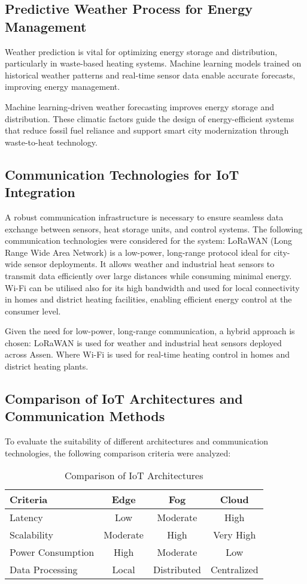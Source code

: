 \documentclass[conference]{IEEEtran}
\begin{document}
\subsection{Predictive Weather Process for Energy Management}

Weather prediction is vital for optimizing energy storage and distribution, particularly in waste-based heating systems. Machine learning models trained on historical weather patterns and real-time sensor data enable accurate forecasts, improving energy management.

Machine learning-driven weather forecasting improves energy storage and distribution. These climatic factors guide the design of energy-efficient systems that reduce fossil fuel reliance and support smart city modernization through waste-to-heat technology.

\subsection{Communication Technologies for IoT Integration}

A robust communication infrastructure is necessary to ensure seamless data exchange between sensors, heat storage units, and control systems. The following communication technologies were considered for the system:
LoRaWAN (Long Range Wide Area Network) is a low-power, long-range protocol ideal for city-wide sensor deployments. It allows weather and industrial heat sensors to transmit data efficiently over large distances while consuming minimal energy.
Wi-Fi can be utilised also for its high bandwidth and used for local connectivity in homes and district heating facilities, enabling efficient energy control at the consumer level.

Given the need for low-power, long-range communication, a hybrid approach is chosen:
LoRaWAN is used for weather and industrial heat sensors deployed across Assen. Where Wi-Fi is used for real-time heating control in homes and district heating plants.

\subsection{Comparison of IoT Architectures and Communication Methods}

To evaluate the suitability of different architectures and communication technologies, the following comparison criteria were analyzed:

\begin{table}[h]
\centering
\caption{Comparison of IoT Architectures}
\begin{tabular}{|l|c|c|c|}
\hline
\textbf{Criteria} & \textbf{Edge} & \textbf{Fog} & \textbf{Cloud} \\
\hline
Latency & Low & Moderate & High \\
Scalability & Moderate & High & Very High \\
Power Consumption & High & Moderate & Low \\
Data Processing & Local & Distributed & Centralized \\
\hline
\end{tabular}
\end{table}
\end{document}
